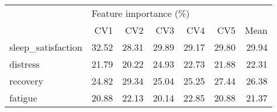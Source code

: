 \begin{tabular}{lrrrrrr}
\toprule
{} & \multicolumn{6}{l}{Feature importance (\%)} \\
{} &                    CV1 &    CV2 &    CV3 &    CV4 &    CV5 &   Mean \\
\midrule
sleep\_satisfaction &                  32.52 &  28.31 &  29.89 &  29.17 &  29.80 &  29.94 \\
distress           &                  21.79 &  20.22 &  24.93 &  22.73 &  21.88 &  22.31 \\
recovery           &                  24.82 &  29.34 &  25.04 &  25.25 &  27.44 &  26.38 \\
fatigue            &                  20.88 &  22.13 &  20.14 &  22.85 &  20.88 &  21.37 \\
\bottomrule
\end{tabular}
